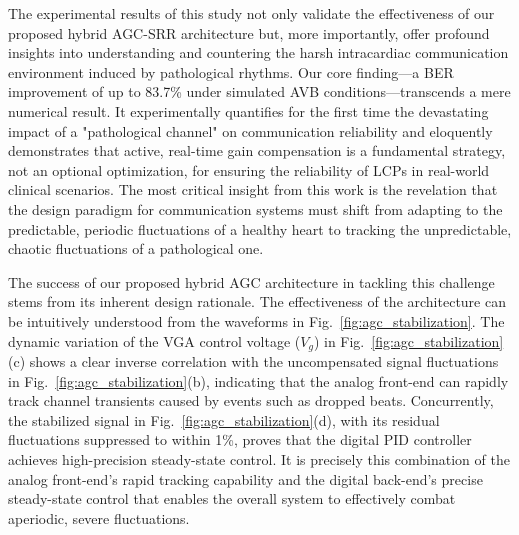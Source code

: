 \documentclass[journal]{IEEEtran}
\begin{document}
The experimental results of this study not only validate the effectiveness of our proposed hybrid AGC-SRR architecture but, more importantly, offer profound insights into understanding and countering the harsh intracardiac communication environment induced by pathological rhythms. Our core finding—a BER improvement of up to 83.7\% under simulated AVB conditions—transcends a mere numerical result. It experimentally quantifies for the first time the devastating impact of a "pathological channel" on communication reliability and eloquently demonstrates that active, real-time gain compensation is a fundamental strategy, not an optional optimization, for ensuring the reliability of LCPs in real-world clinical scenarios. The most critical insight from this work is the revelation that the design paradigm for communication systems must shift from adapting to the predictable, periodic fluctuations of a healthy heart to tracking the unpredictable, chaotic fluctuations of a pathological one.

The success of our proposed hybrid AGC architecture in tackling this challenge stems from its inherent design rationale. The effectiveness of the architecture can be intuitively understood from the waveforms in Fig.~\ref{fig:agc_stabilization}. The dynamic variation of the VGA control voltage ($V_g$) in Fig.~\ref{fig:agc_stabilization}(c) shows a clear inverse correlation with the uncompensated signal fluctuations in Fig.~\ref{fig:agc_stabilization}(b), indicating that the analog front-end can rapidly track channel transients caused by events such as dropped beats. Concurrently, the stabilized signal in Fig.~\ref{fig:agc_stabilization}(d), with its residual fluctuations suppressed to within 1\%, proves that the digital PID controller achieves high-precision steady-state control. It is precisely this combination of the analog front-end's rapid tracking capability and the digital back-end's precise steady-state control that enables the overall system to effectively combat aperiodic, severe fluctuations.
\end{document}

